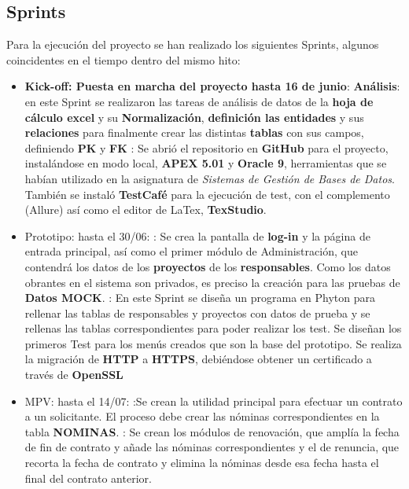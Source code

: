 \subsection{\gls{Sprint}s}
Para la ejecución del proyecto se han realizado los siguientes \gls{Sprint}s, algunos coincidentes en el tiempo dentro del mismo hito:
\begin{itemize}
	\item \textbf{Kick-off: Puesta en marcha del proyecto hasta 16 de junio}:
	\subitem \textbf{Análisis}: en este \gls{Sprint} se realizaron las tareas de análisis de datos de la \textbf{hoja de cálculo excel} y su \textbf{\gls{Normalización}}, \textbf{definición las entidades} y sus \textbf{relaciones} para finalmente crear las distintas \textbf{tablas} con sus campos, definiendo \textbf{\acrshort{PK}} y \textbf{\acrshort{FK}} 
	: Se abrió el repositorio en \textbf{GitHub} para el proyecto, instalándose en modo local, \textbf{\acrshort{APEX} 5.01} y \textbf{Oracle 9}, herramientas que se habían utilizado en la asignatura de \textit{Sistemas de Gestión de Bases de Datos}. También se instaló \textbf{TestCafé} para la ejecución de test, con el complemento (Allure) así como el editor de LaTex, \textbf{TexStudio}.
	\item{Prototipo: hasta el 30/06}:
	: Se crea la pantalla de \textbf{log-in} y la página de entrada principal, así como el primer módulo de Administración, que contendrá los datos de los \textbf{proyectos} de los \textbf{responsables}. Como los datos obrantes en el sistema son privados, es preciso la creación para las pruebas de \textbf{\gls{Datos MOCK}}.
	: En este \gls{Sprint} se diseña un programa en Phyton para rellenar las tablas de responsables y proyectos con datos de prueba y se rellenas las tablas correspondientes para poder realizar los test. Se diseñan los primeros Test para los menús creados que son la base del prototipo. Se realiza la migración de \textbf{HTTP} a \textbf{\acrshort{HTTPS}}, debiéndose obtener un certificado a través de \textbf{OpenSSL}
	\item{MPV: hasta el 14/07}: 
	:Se crean la utilidad principal para efectuar un contrato a un solicitante. El proceso debe crear las nóminas correspondientes en la tabla \textbf{NOMINAS}.
	: Se crean los módulos de renovación, que amplía la fecha de fin de contrato y añade las nóminas correspondientes y el de renuncia, que recorta la fecha de contrato y elimina la nóminas desde esa fecha hasta el final del contrato anterior.

\end{itemize}
